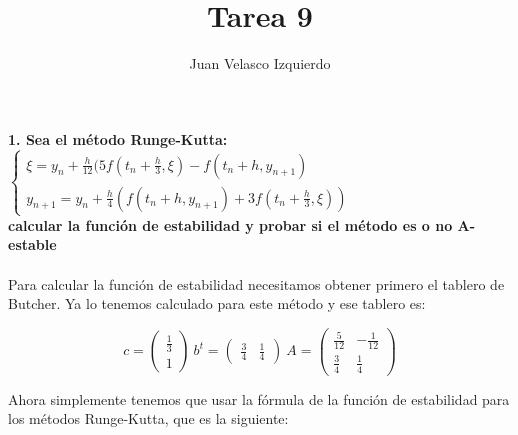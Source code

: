 \documentclass[a4paper,11pt,spanish,leqno]{article}
\title{Tarea 9}
\author{Juan Velasco Izquierdo}
\begin{document}
\maketitle
\paragraph{}\textbf{1. Sea el método Runge-Kutta: \\
$\left\{
\begin{array}{rcl}
     \xi = y_n + \frac{h}{12}(5f(t_n +\frac{h}{3},\xi) - f(t_n+h,y_{n+1})
  \\  y_{n+1} = y_n + \frac{h}{4}(f(t_n+h,y_{n+1}) + 3f(t_n+\frac{h}{3},\xi))
\end{array}
\right.$ \\
calcular la función de estabilidad y probar si el método es o no A-estable}

\paragraph{}Para calcular la función de estabilidad necesitamos obtener primero el tablero de Butcher. Ya lo tenemos calculado para este método y ese tablero es:

\[c = 
\begin{pmatrix}
	\frac{1}{3} \\
	1
\end{pmatrix} \ 
b^t = 
\begin{pmatrix}
	\frac{3}{4} & \frac{1}{4}
\end{pmatrix} \
A = 
\begin{pmatrix}
	\frac{5}{12} & -\frac{1}{12} \\
	\frac{3}{4} & \frac{1}{4}
\end{pmatrix} 
\]

Ahora simplemente tenemos que usar la fórmula de la función de estabilidad para los métodos Runge-Kutta, que es la siguiente:
\end{document}
